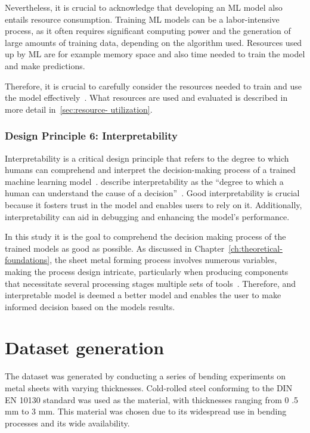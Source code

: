 Nevertheless, it is crucial to acknowledge that developing an \ac{ML} model also entails resource
consumption.
Training \ac{ML} models can be a labor-intensive process, as it often requires significant
computing power and the generation of large amounts of training data, depending on the algorithm
used.
Resources used up by \ac{ML} are for example memory space and also time needed to train the model and make predictions.

Therefore, it is crucial to carefully consider the resources needed to train and use the model
effectively~\cite[p. 16]{siebert2022construction}.
What resources are used and evaluated is described in more detail in~\ref{sec:resource- utilization}.

\subsubsection*{Design Principle 6: Interpretability}
Interpretability is a critical design principle that refers to the degree to which humans can comprehend and
interpret the decision-making process of a trained machine learning model~\cite[p. 13]{molnar2020interpretable}.
\cite{miller2019explanation} describe interpretability as the ``degree to which a human can understand the cause
of a decision''~\cite[p. 1]{miller2019explanation}.
Good interpretability is crucial because it fosters trust in the model and enables users to rely on it.
Additionally, interpretability can aid in debugging and enhancing the model's performance.

In this study it is the goal to comprehend the decision making process of the trained models as good as possible.
As discussed in Chapter~\ref{ch:theoretical-foundations}, the sheet metal forming process involves numerous
variables, making the process design intricate, particularly when producing components that necessitate several
processing stages multiple sets of tools~\cite[p. 1]{dib_singleensembleclassifiers_2020}.
Therefore,  and interpretable model is deemed a better model and enables the user to make informed decision based
on the models results.


\section{Dataset generation}\label{sec:dataset-generation}

The dataset was generated by conducting a series of bending experiments on metal sheets with varying thicknesses.
Cold-rolled steel conforming to the DIN EN 10130 standard was used as the material, with thicknesses ranging from 0
.5 mm to 3 mm.
This material was chosen due to its widespread use in bending processes and its wide availability.

